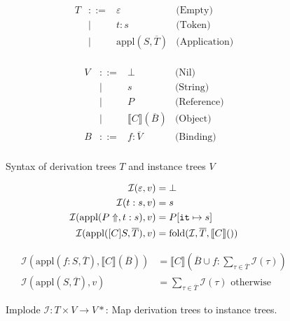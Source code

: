 \documentclass[a4paper]{article}
\begin{document}
\begin{figure}
\begin{minipage}{0.5\textwidth}
\[
\begin{array}{rcll}
T & ::=  &\varepsilon & \text{(Empty)}\\
  & \mid & t: s & \text{(Token)}\\
  & \mid & \text{appl}(S, \overline{T}) & \text{(Application)}\\
\end{array}
\]
\end{minipage}
\begin{minipage}{0.5\textwidth}
\[
\begin{array}{rcll}
V & ::=  & \bot & \text{(Nil)}\\
  & \mid & s  & \text{(String)}\\
  & \mid & P  & \text{(Reference)}\\
  & \mid & \llbracket C \rrbracket(\overline{B}) & \text{(Object)}\\
B & ::= & f: \overline{V} & \text{(Binding)}\\
\end{array}
\]
\end{minipage}
\caption{Syntax of derivation trees $T$ and instance trees $V$\label{FIG:derivationInstancs}}
\end{figure}









\def\implode{\ensuremath{\mathcal{I}}}

\begin{figure}
\begin{minipage}[t]{0.4\textwidth}
\begin{align*}
\implode(\varepsilon, v) &= \bot\\
\implode(t: s, v) &= s\\
\implode(\text{appl}(P\Uparrow, t: s), v) &= P[\text{\texttt{it}}\mapsto s]\\
\implode(\text{appl}([C] S, \overline{T}), v) &=
\text{fold}(\implode, \overline{T}, \llbracket C\rrbracket())\\
\end{align*}
\end{minipage}
\begin{minipage}[t]{0.6\textwidth}
\begin{align*}
\implode(\text{appl}(f:S, \overline{T}), 
\llbracket C\rrbracket(\overline{B})) 
&= \llbracket C\rrbracket(\overline{B} \cup f: \sum_{\tau\in\overline{T}}\implode(\tau))\\
\implode(\text{appl}(S,\overline{T}), v) &= 
\sum_{\tau\in \overline{T}}\implode(\tau)\text{ otherwise }
\end{align*}
\end{minipage}
\caption{Implode $\implode: T\times V\rightarrow V*$: Map derivation
  trees to instance trees.\label{FIG:implode}}
\end{figure}
\end{document}
